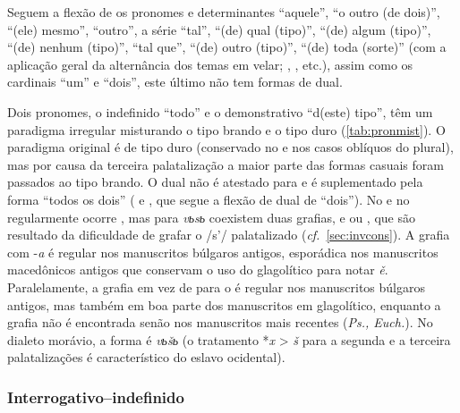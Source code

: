 Seguem a flexão de  os pronomes e determinantes
 ``aquele'',  ``o outro (de dois)'',
 ``(ele) mesmo'',  ``outro'', a série
 ``tal'',  ``(de) qual (tipo)'',
 ``(de) algum (tipo)'',  ``(de) nenhum
(tipo)'',  ``tal que'',  ``(de)
outro (tipo)'',  ``(de) toda (sorte)'' (com a aplicação
geral da alternância dos temas em velar;  ,
 , etc.), assim como os cardinais
 ``um'' e  ``dois'', este último não tem
formas de dual.



Dois pronomes, o indefinido  ``todo'' e o demonstrativo
 ``d(este) tipo'', têm um paradigma irregular misturando
o tipo brando e o tipo duro (\autoref{tab:pronmist}). O paradigma original é de
tipo
duro (conservado no  e nos casos oblíquos do plural),
mas por causa da terceira palatalização a maior parte das formas casuais
foram passados ao tipo brando. O dual não é atestado para
 e é suplementado pela forma  ``todos os
dois'' ( e  , que segue a flexão de dual de
 ``dois''). No  e no  regularmente
ocorre , mas para \emph{vьsь} coexistem duas grafias,
 e  ou , que são resultado
da dificuldade de grafar o /s'/ palatalizado (\emph{cf.}~\ref{sec:invcons}). A grafia com
-\emph{a} é regular nos manuscritos búlgaros antigos, esporádica nos
manuscritos macedônicos antigos que conservam o uso do glagolítico para
notar \emph{ě}. Paralelamente, a grafia  em vez de
para o  é regular nos manuscritos búlgaros antigos, mas também
em boa parte dos manuscritos em glagolítico, enquanto a grafia  não é
encontrada senão nos manuscritos mais recentes (\emph{Ps., Euch.}). No
dialeto morávio, a forma é \emph{vьšь} (o tratamento *\emph{x}
> \emph{š} para a segunda e a terceira palatalizações é
característico do eslavo ocidental).


\subsubsection{Interrogativo--indefinido}

